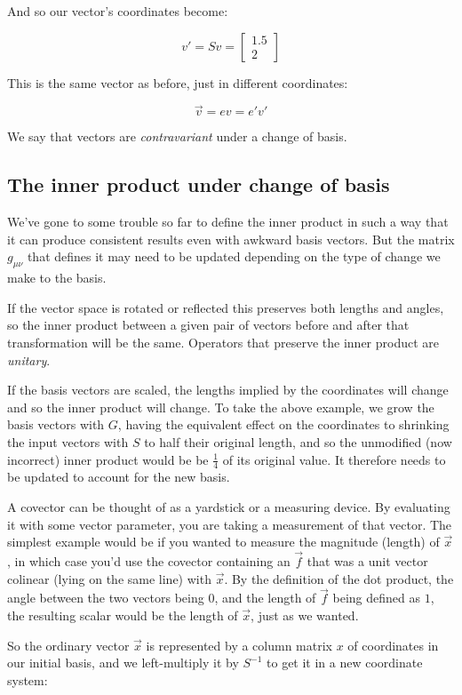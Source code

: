 And so our vector's coordinates become:

$$v' = Sv = \begin{bmatrix}1.5 \\ 2\end{bmatrix}$$

This is the same vector as before, just in different coordinates:

$$\vec{v} = ev = e'v'$$

We say that vectors are \textit{contravariant} under a change of basis.

\subsection{The inner product under change of basis}

We've gone to some trouble so far to define the inner product in such a way that it can produce consistent results even with awkward basis vectors. But the matrix $g_{\mu\nu}$ that defines it may need to be updated depending on the type of change we make to the basis.

If the vector space is rotated or reflected this preserves both lengths and angles, so the inner product between a given pair of vectors before and after that transformation will be the same. Operators that preserve the inner product are \textit{unitary}.

If the basis vectors are scaled, the lengths implied by the coordinates will change and so the inner product will change. To take the above example, we grow the basis vectors with $G$, having the equivalent effect on the coordinates to shrinking the input vectors with $S$ to half their original length, and so the unmodified (now incorrect) inner product would be be $\frac{1}{4}$ of its original value. It therefore needs to be updated to account for the new basis.

A covector can be thought of as a yardstick or a measuring device. By evaluating it with some vector parameter, you are taking a measurement of that vector. The simplest example would be if you wanted to measure the magnitude (length) of $\vec{x}$, in which case you'd use the covector containing an $\vec{f}$ that was a unit vector colinear (lying on the same line) with $\vec{x}$. By the definition of the dot product, the angle between the two vectors being $0$, and the length of $\vec{f}$ being defined as $1$, the resulting scalar would be the length of $\vec{x}$, just as we wanted.

So the ordinary vector $\vec{x}$ is represented by a column matrix $x$ of coordinates in our initial basis, and we left-multiply it by $S^{-1}$ to get it in a new coordinate system:

